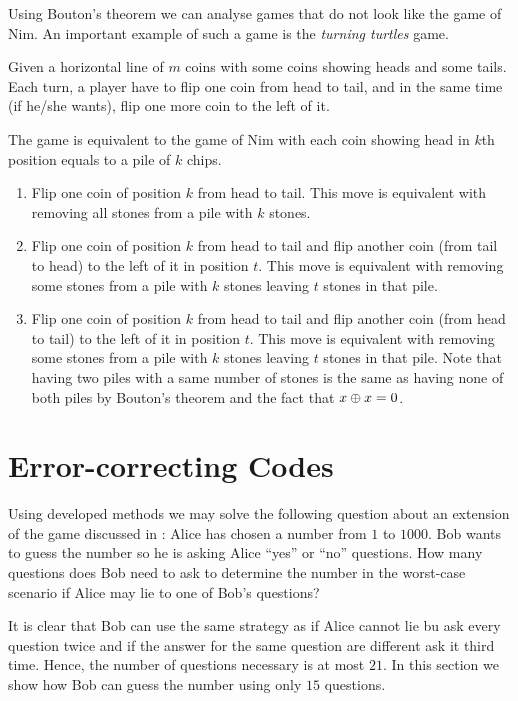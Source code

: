 Using Bouton's theorem we can analyse games that do not look like the game of
Nim. An important example of such a game is the \emph{turning turtles} game.
\begin{game}
  Given a horizontal line of $m$ coins with some coins showing heads and some
  tails. Each turn, a player have to flip one coin from head to tail, and in the
  same time (if he/she wants), flip one more coin to the left of it.
\end{game}
The game is equivalent to the game of Nim with each coin showing head in $k$th
position equals to a pile of $k$ chips.
\begin{enumerate}
  \item Flip one coin of position $k$ from head to tail. This move is equivalent
    with removing all stones from a pile with $k$ stones.
  \item Flip one coin of position $k$ from head to tail and flip another coin
    (from tail to head) to the left of it in position $t$. This move is equivalent
    with removing some stones from a pile with $k$ stones leaving $t$ stones in
    that pile.
  \item Flip one coin of position $k$ from head to tail and flip another coin 
    (from head to tail) to the left of it in position $t$. This move is equivalent
    with removing some stones from a pile with $k$ stones leaving $t$ stones in that
    pile. Note that having two piles with a same number of stones is the same as
    having none of both piles by Bouton's theorem and the fact that 
    $x \oplus x = 0$.
\end{enumerate}

\section{Error-correcting Codes}
Using developed methods we may solve the following question about an extension
of the game discussed in :
Alice has chosen a number from $1$ to $1000$. Bob wants to
guess the number so he is asking Alice ``yes'' or ``no'' questions.
How many questions does Bob need to ask to determine the number in the
worst-case scenario if Alice may lie to one of Bob's questions?

It is clear that Bob can use the same strategy as if Alice cannot lie bu ask
every question twice and if the answer for the same question are different ask
it third time. Hence, the number of questions necessary is at most $21$. In this
section we show how Bob can guess the number using only $15$ questions.

